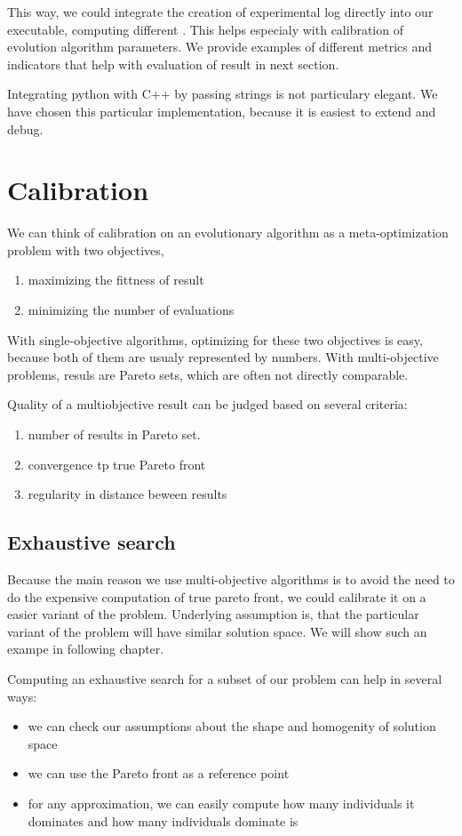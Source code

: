 \documentclass[12pt,oneside,draft]{fithesis2}
\begin{document}
This way, we could integrate the creation of experimental log directly into our executable, computing different . This helps especialy with calibration of evolution algorithm parameters.
We provide examples of different metrics and indicators that help with evaluation of result in next section.

Integrating python with C++ by passing strings is not particulary elegant. We have chosen this particular implementation, because it is easiest to extend and debug.
\section{Calibration}

We can think of calibration on an evolutionary algorithm as a meta-optimization problem with two objectives, 

\begin{enumerate}
\item maximizing the fittness of result
\item minimizing the number of evaluations
\end{enumerate}
With single-objective algorithms, optimizing for these two objectives is easy, because both of them are usualy represented by numbers.
With multi-objective problems, resuls are Pareto sets, which are often not directly comparable.

Quality of a multiobjective result can be judged based on several criteria:
\begin{enumerate}
\item number of results in Pareto set.
\item convergence tp true Pareto front
\item regularity in distance beween results
\end{enumerate}


\subsection{Exhaustive search}
Because the main reason we use multi-objective algorithms is to avoid the need to do the expensive computation of true pareto front,
we could calibrate it on a easier variant of the problem. Underlying assumption is, that the particular variant of the problem will have similar solution space. We will show such an exampe in following chapter.

Computing an exhaustive search for a subset of our problem can help in several ways:
\begin{itemize}
  \item we can check our assumptions about the shape and homogenity of solution space
  \item we can use the Pareto front as a reference point
  \item for any approximation, we can easily compute how many individuals it dominates and how many individuals dominate is
\end{itemize}
\end{document}
